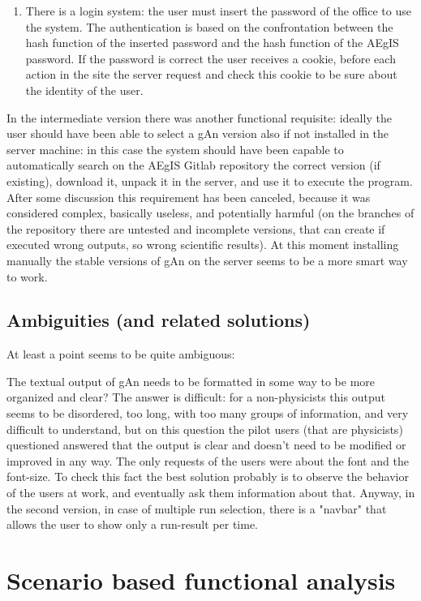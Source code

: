 \begin{enumerate}
\item There is a login system: the user must insert the password of the office to use the system. The authentication is based on the confrontation between the hash function of the inserted password and the hash function of the AEgIS password. If the password is correct the user receives a cookie, before each action in the site the server request and check this cookie to be sure about the identity of the user.  

\end{enumerate}

In the intermediate version there was another functional requisite: ideally the user should have been able to select a gAn version also if not installed in the server machine: in this case the system should have been capable to automatically search on the AEgIS Gitlab repository the correct version (if existing), download it, unpack it in the server, and use it to execute the program. 
After some discussion this requirement has been canceled, because it was considered complex, basically useless, and potentially harmful (on the branches of the repository there are untested and incomplete versions, that can create if executed wrong outputs, so wrong scientific results). At this moment installing manually the stable versions of gAn on the server seems to be a more smart way to work.


\subsection{Ambiguities (and related solutions)}

At least a point seems to be quite ambiguous: 

The textual output of gAn needs to be formatted in some way to be more organized and clear? 
The answer is difficult: for a non-physicists this output seems to be disordered, too long, with too many groups of information, and very difficult to understand, but on this question the pilot users (that are physicists) questioned answered that the output is clear and doesn't need to be modified or improved in any way. The only requests of the users were about the font and the font-size. To check this fact the best solution probably is to observe the behavior of the users at work, and eventually ask them information about that.
Anyway, in the second version, in case of multiple run selection, there is a "navbar" that allows the user to show only a run-result per time.


\section{Scenario based functional analysis}

